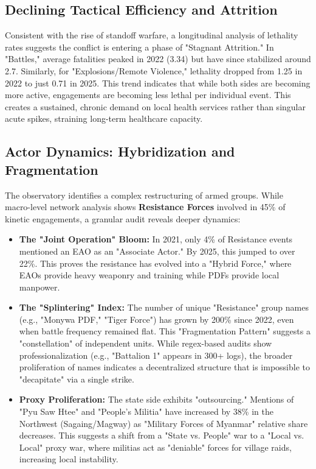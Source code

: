 \documentclass[conference]{IEEEtran}
\begin{document}
\subsection{Declining Tactical Efficiency and Attrition}
Consistent with the rise of standoff warfare, a longitudinal analysis of lethality rates suggests the conflict is entering a phase of "Stagnant Attrition." In "Battles," average fatalities peaked in 2022 (3.34) but have since stabilized around 2.7. Similarly, for "Explosions/Remote Violence," lethality dropped from 1.25 in 2022 to just 0.71 in 2025. This trend indicates that while both sides are becoming more active, engagements are becoming less lethal per individual event. This creates a sustained, chronic demand on local health services rather than singular acute spikes, straining long-term healthcare capacity.

\subsection{Actor Dynamics: Hybridization and Fragmentation}
The observatory identifies a complex restructuring of armed groups. While macro-level network analysis shows \textbf{Resistance Forces} involved in 45\% of kinetic engagements, a granular audit reveals deeper dynamics:

\begin{itemize}
    \item \textbf{The "Joint Operation" Bloom:} In 2021, only 4\% of Resistance events mentioned an EAO as an "Associate Actor." By 2025, this jumped to over 22\%. This proves the resistance has evolved into a "Hybrid Force," where EAOs provide heavy weaponry and training while PDFs provide local manpower.
    
    \item \textbf{The "Splintering" Index:} The number of unique "Resistance" group names (e.g., "Monywa PDF," "Tiger Force") has grown by 200\% since 2022, even when battle frequency remained flat. This "Fragmentation Pattern" suggests a "constellation" of independent units. While regex-based audits show professionalization (e.g., "Battalion 1" appears in 300+ logs), the broader proliferation of names indicates a decentralized structure that is impossible to "decapitate" via a single strike.
    
    \item \textbf{Proxy Proliferation:} The state side exhibits "outsourcing." Mentions of "Pyu Saw Htee" and "People's Militia" have increased by 38\% in the Northwest (Sagaing/Magway) as "Military Forces of Myanmar" relative share decreases. This suggests a shift from a "State vs. People" war to a "Local vs. Local" proxy war, where militias act as "deniable" forces for village raids, increasing local instability.
\end{itemize}
\end{document}
